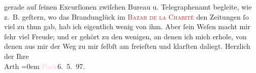                gerade auf ſeinen Excurſionen zwiſchen Bureau u. Telegraphenamt begleite, wie z. B.
               geſtern, wo das Brandunglück im \textcolor{brown}{\textsc{Bazar de la Charité}}{}\ledrightnote{\textcolor{brown}{Bazar de la Charité}} den Zeitungen ſo {\pb}viel zu thun gab, hab ich
               eigentlich wenig von ihm. Aber ſein Weſen macht mir ſehr viel Freude; und er gehört
               zu den wenigen, an denen ich mich erhole, von denen aus mir der Weg zu mir ſelbſt am
               freieſten und klarſten daliegt.\pend
           \pstart
           Herzlich der Ihre{\\[\baselineskip]}\spacefill\mbox{Arth}\pend
           \leftskip=0em{}\pstart
           \textcolor{pink}{Paris}{}\ledrightnote{\textcolor{pink}{Paris}}{ }6. 5. 97.\pend
           \endnumbering{}  
      